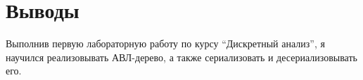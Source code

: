 \section{Выводы}

Выполнив первую лабораторную работу по курсу \enquote{Дискретный анализ}, я научился реализовывать АВЛ-дерево, а также сериализовать и десериализовывать его.

\pagebreak
